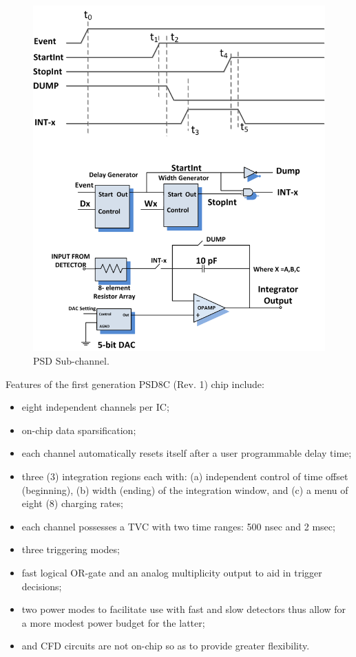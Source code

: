 \documentclass[12pt,oneside,final]{siuethesis}
\theoremstyle{definition}
\begin{document}
\begin{figure}[htbp!]
	\centering
 	\includegraphics[scale=1.3,keepaspectratio=true]{./ch1_figures/PSD_sub_channel.png}
 	\caption{PSD Sub-channel.}
 	\label{FIG:PSD_SUB_CHANNEL}
\end{figure}

Features of the first generation PSD8C (Rev. 1) chip include:
\begin{itemize}
\item
eight independent channels per IC;
\item
on-chip data sparsification;
\item
each channel automatically resets itself after a user programmable delay time;
\item
three (3) integration regions each with: (a) independent
control of time offset (beginning), (b) width (ending) of the
integration window, and (c) a menu of eight (8) charging rates;
\item
each channel possesses a TVC with two time ranges: 500 nsec and 2 msec;
\item
three triggering modes;
\item
fast logical OR-gate and an analog multiplicity output to aid in
trigger decisions;
\item
two power modes to facilitate use with fast and slow detectors
thus allow for a more modest power budget for the
latter; 
\item
and CFD circuits are not on-chip so as to provide greater flexibility.
\end{itemize}
\end{document}
